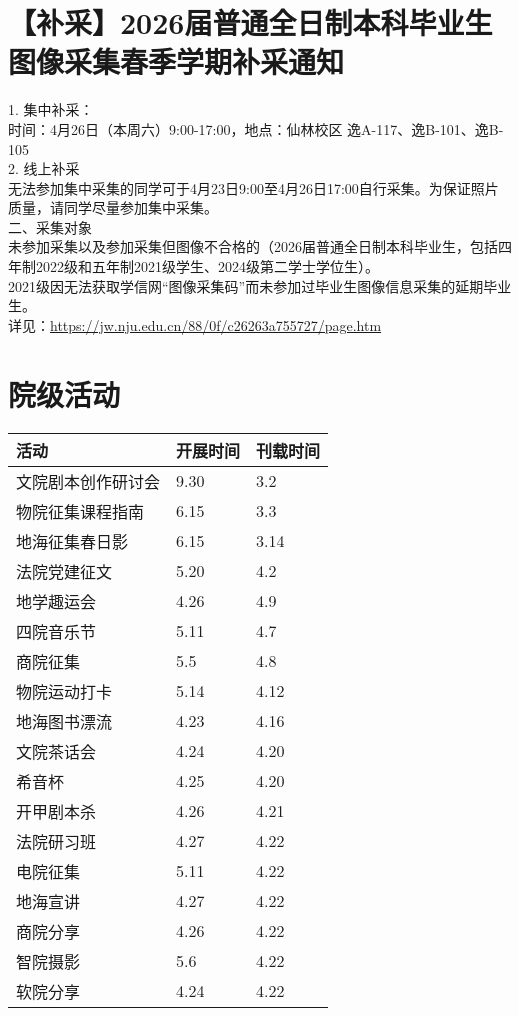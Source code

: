 \documentclass[letterpaper, 12pt]{article}
\begin{document}
\begin{multicols}{2}
\section{【补采】2026届普通全日制本科毕业生图像采集春季学期补采通知} %
1. 集中补采：
\\时间：4月26日（本周六）9:00-17:00，地点：仙林校区 逸A-117、逸B-101、逸B-105
\\2. 线上补采
\\无法参加集中采集的同学可于4月23日9:00至4月26日17:00自行采集。为保证照片质量，请同学尽量参加集中采集。
\\二、采集对象
\\未参加采集以及参加采集但图像不合格的（2026届普通全日制本科毕业生，包括四年制2022级和五年制2021级学生、2024级第二学士学位生）。
\\2021级因无法获取学信网“图像采集码”而未参加过毕业生图像信息采集的延期毕业生。
\\详见：\url{https://jw.nju.edu.cn/88/0f/c26263a755727/page.htm}
\section{院级活动}
\begin{tabular}{|>{\centering\arraybackslash}m{}|m{}|m{}|}
\hline
    活动 & 开展时间 & 刊载时间\\
    \hline\hline
    文院剧本创作研讨会 & 9.30 & 3.2\\
    物院征集课程指南 & 6.15 & 3.3\\
    地海征集春日影 & 6.15 & 3.14\\
    法院党建征文 & 5.20 & 4.2\\
    地学趣运会 & 4.26 & 4.9\\
    四院音乐节 & 5.11 & 4.7\\
    商院征集 & 5.5 & 4.8\\
    物院运动打卡 & 5.14 & 4.12\\
    地海图书漂流 & 4.23 & 4.16\\
    文院茶话会 & 4.24 & 4.20\\
    希音杯 & 4.25 & 4.20\\
    开甲剧本杀 & 4.26 & 4.21\\
    法院研习班 & 4.27 & 4.22\\
    电院征集 & 5.11 & 4.22\\
    地海宣讲 & 4.27 & 4.22\\
    商院分享 & 4.26 & 4.22\\
    智院摄影 & 5.6 & 4.22\\
    软院分享 & 4.24 & 4.22\\
    \hline
\end{tabular}

\end{multicols}
\end{document}
